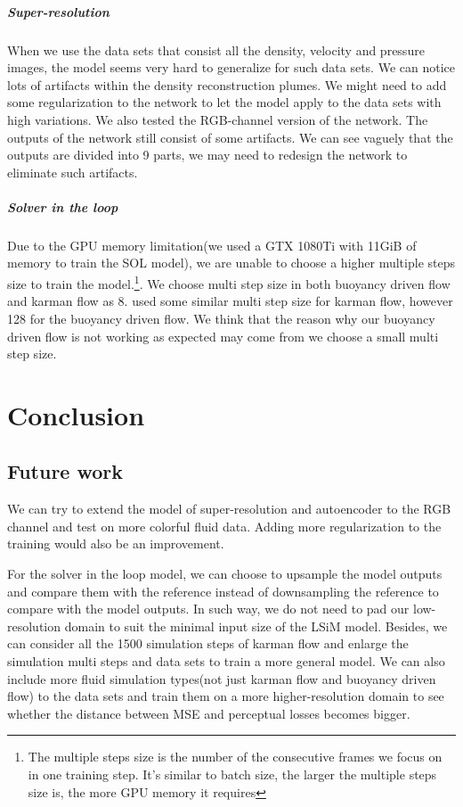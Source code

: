 \documentclass[a4paper,12pt,twoside]{report}
\begin{document}
\paragraph{Super-resolution} When we use the data sets that consist all the density, velocity and pressure images, the model seems very hard to generalize for such data sets. We can notice lots of artifacts within the density reconstruction plumes. We might need to add some regularization to the network to let the model apply to the data sets with high variations. We also tested the RGB-channel version of the network. The outputs of the network still consist of some artifacts. We can see vaguely that the outputs are divided into 9 parts, we may need to redesign the network to eliminate such artifacts.
\paragraph{Solver in the loop}Due to the GPU memory limitation(we used a GTX 1080Ti with 11GiB of memory to train the SOL  model), we are unable to choose a higher multiple steps size to train the model.\footnote{The multiple steps size is the number of the consecutive frames we focus on in one training step. It's similar to batch size, the larger the multiple steps size is, the more GPU memory it requires}. We choose multi step size in both buoyancy driven flow and karman flow as 8. \citeauthor{um2020sol} used some similar multi step size for karman flow, however 128 for the buoyancy driven flow. We think that the reason why our buoyancy driven flow is not working as expected may come from we choose a small multi step size.





\chapter{Conclusion}
\section{Future work}
We can try to extend the model of super-resolution and autoencoder to the RGB channel and test on more colorful fluid data. Adding more regularization to the training would also be an improvement.

For the solver in the loop model, we can choose to upsample the model outputs and compare them with the reference instead of downsampling the reference to compare with the model outputs. In such way, we do not need to pad our low-resolution domain to suit the minimal input size of the LSiM model. Besides, we can consider all the 1500 simulation steps of karman flow and enlarge the simulation multi steps and data sets to train a more general model. We can also include more fluid simulation types(not just karman flow and buoyancy driven flow) to the data sets and train them on a more higher-resolution domain to see whether the distance between MSE and perceptual losses becomes bigger.
\end{document}
